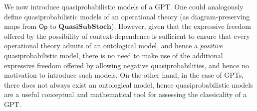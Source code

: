 \documentclass[onecolum,aps,groupedaddress,nofootinbib]{revtex4-2}
\newcommand\Op{\mathsf{Op}}
\newcommand\QSS{\mathbf{QuasiSubStoch}}
\begin{document}
We now introduce quasiprobabilistic models of a GPT. One could analogously define quasiprobabilistic models of an operational theory (as diagram-preserving maps from $\Op$ to $\QSS$).  However, given that the expressive freedom offered by the possibility of context-dependence is sufficient to ensure that every operational theory admits of an ontological model, and hence a {\em positive} quasiprobabilistic model, there is no need to make use of the additional expressive freedom offered by allowing negative quasiprobabilities, and hence no motivation to introduce such models.
On the other hand, in the case of GPTs, there does not always exist an ontological model, hence quasiprobabilistic models are a useful conceptual and mathematical tool for assessing the classicality of a GPT.
\end{document}
